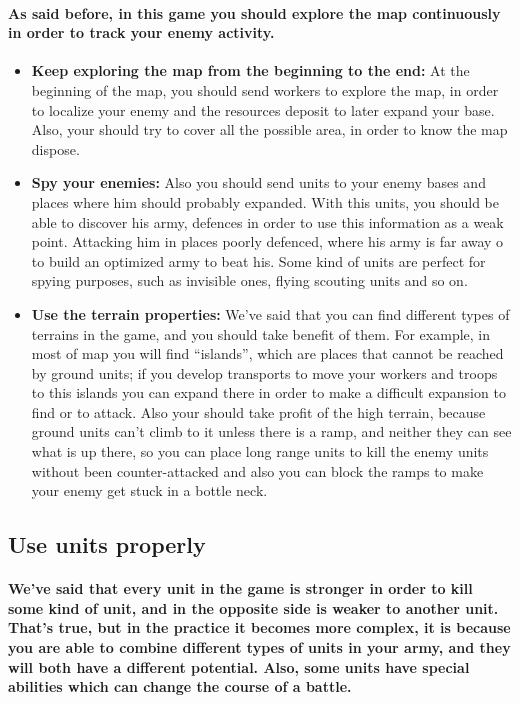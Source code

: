 \documentclass[a4paper,10pt]{article}
\newcommand{\p}[1]{\paragraph{\indent\textnormal{#1}}}
\begin{document}
    \p{As said before, in this game you should explore the map continuously in order to track your enemy activity.}

    \begin{itemize}
     \item \textbf{Keep exploring the map from the beginning to the end:} At the beginning of the map, you should send workers to explore the map, in order to localize your enemy and the resources deposit to later expand your base. Also, your should try to cover all the possible area, in order to know the map dispose.
     \item \textbf{Spy your enemies:} Also you should send units to your enemy bases and places where him should probably expanded. With this units, you should be able to discover his army, defences in order to use this information as a weak point. Attacking him in places poorly defenced, where his army is far away o to build an optimized army to beat his. Some kind of units are perfect for spying purposes, such as invisible ones, flying scouting units and so on.
     \item \textbf{Use the terrain properties:} We've said that you can find different types of terrains in the game, and you should take benefit of them. For example,  in most of map you will find ``islands'', which are places that cannot be reached by ground units; if you develop transports to move your workers and troops to this islands you can expand there in order to make a difficult expansion to find or to attack. Also your should take profit of the high terrain, because ground units can't climb to it unless there is a ramp, and neither they can see what is up there, so you can place long range units to kill the enemy units without been counter-attacked and also you can block the ramps to make your enemy get stuck in a bottle neck.
    \end{itemize}

  \subsection{Use units properly}

     \p{We've said that every unit in the game is stronger in order to kill some kind of unit, and in the opposite side is weaker to another unit. That's true, but in the practice it becomes more complex, it is because you are able to combine different types of units in your army, and they will both have a different potential. Also, some units have special abilities which can change the course of a battle.}
\end{document}
